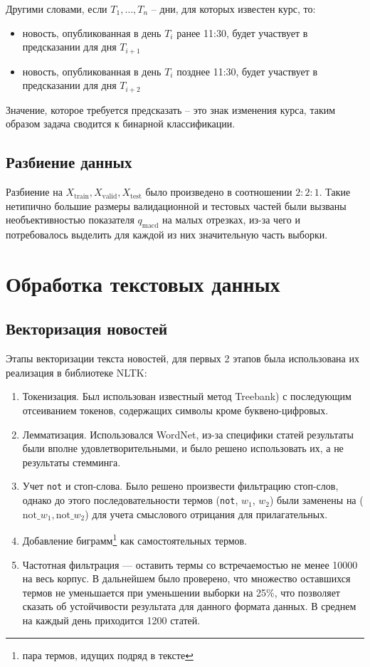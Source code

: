 \documentclass[pdftex,ptm,14pt,a4paper]{extreport}
\begin{document}
Другими словами, если $T_1,\ldots , T_n$ -- дни, для которых известен курс, то:
\begin{itemize}
\item новость, опубликованная в день $T_i$ ранее 11:30, будет участвует в предсказании для дня $T_{i+1}$
\item новость, опубликованная в день $T_i$ позднее 11:30, будет участвует в предсказании для дня $T_{i+2}$
\end{itemize}

Значение, которое требуется предсказать -- это знак изменения курса, таким образом задача сводится к бинарной классификации.

\subsection{Разбиение данных}

Разбиение на $X_\text{train}, X_\text{valid}, X_\text{test}$ было произведено в соотношении $2:2:1$.
Такие нетипично большие размеры валидационной
и тестовых частей были вызваны необъективностью показателя $q_\text{macd}$ на малых отрезках, из-за чего и потребовалось выделить для каждой из них значительную часть выборки.

\section{Обработка текстовых данных}

\subsection{Векторизация новостей}

Этапы векторизации текста новостей, для первых 2 этапов была использована их реализация в библиотеке NLTK\cite{nltk}:

\begin{enumerate}

\item Токенизация. Был использован известный метод Treebank\cite{treebank}) с последующим отсеиванием токенов,
содержащих символы кроме буквено-цифровых.
\item Лемматизация. Использовался WordNet\cite{wordnet}, из-за специфики статей результаты были вполне удовлетворительными,
и было решено использовать их, а не результаты стемминга.
\item Учет \texttt{not} и стоп-слова. Было решено произвести фильтрацию стоп-слов, однако до этого последовательности
термов (\texttt{not}, $w_1$, $w_2$) были заменены на ($\text{not\_} w_1, \text{not\_} w_2$) для учета смыслового отрицания
для прилагательных.
\item Добавление биграмм\footnote{пара термов, идущих подряд в тексте} как самостоятельных термов.
\item Частотная фильтрация --- оставить термы со встречаемостью не менее 10000 на весь корпус. В дальнейшем было проверено,
что множество оставшихся термов не уменьшается при уменьшении выборки на 25\%, что позволяет сказать об устойчивости
результата для данного формата данных. В среднем на каждый день приходится 1200 статей.

\end{enumerate}
\end{document}
